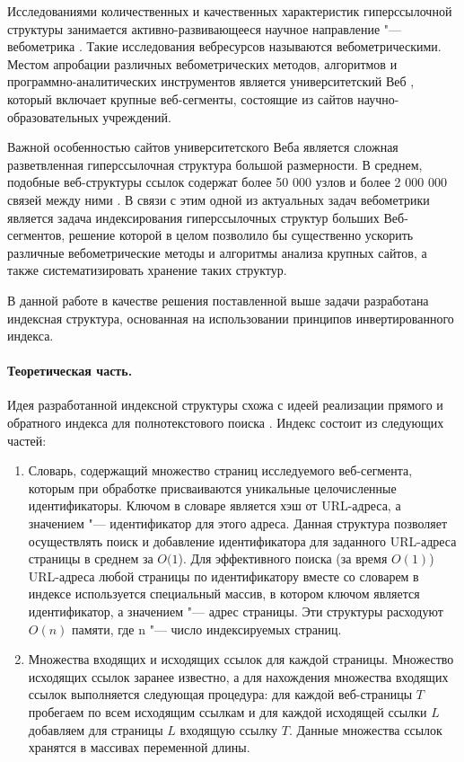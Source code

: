 Исследованиями количественных и качественных характеристик гиперссылочной структуры занимается активно-развивающееся научное направление "--- вебометрика \cite{Pechnikov,PechnikovNwohiri}. Такие исследования вебресурсов называются вебометрическими. Местом апробации различных вебометрических методов, алгоритмов и программно-аналитических инструментов является университетский Веб \cite{Pechnikov,MaksimovBlekanov,BlekanovSergeevMaksimovBOWTIE}, который включает крупные веб-сегменты, состоящие из сайтов научно-образовательных учреждений.

Важной особенностью сайтов университетского Веба является сложная разветвленная гиперссылочная структура большой размерности. В среднем, подобные веб-структуры ссылок содержат более 50 000 узлов и более 2 000 000 связей между ними \cite{Pechnikov,BlekanovSergeevMaksimov}. В связи с этим одной из актуальных задач вебометрики является задача индексирования гиперссылочных структур больших Веб-сегментов, решение которой в целом позволило бы существенно ускорить различные вебометрические методы и алгоритмы анализа крупных сайтов, а также систематизировать хранение таких структур.

В данной работе в качестве решения поставленной выше задачи разработана индексная структура, основанная на использовании принципов инвертированного индекса.

\paragraph{Теоретическая часть.} Идея разработанной индексной структуры схожа с идеей реализации прямого и обратного индекса для полнотекстового поиска \cite{ManningRaghavanSchutze}. Индекс состоит из следующих частей:

\begin{enumerate}
	\item Словарь, содержащий множество страниц исследуемого веб-сегмента, которым при обработке присваиваются уникальные целочисленные идентификаторы. Ключом в словаре является хэш от URL-адреса, а значением "--- идентификатор для этого адреса. Данная структура позволяет осуществлять поиск и добавление идентификатора для заданного URL-адреса страницы в среднем за \(O(1\)). Для эффективного поиска (за время \(O(1)\)) URL-адреса любой страницы по идентификатору вместе со словарем в индексе используется специальный массив, в котором ключом является идентификатор, а значением "--- адрес страницы. Эти структуры расходуют \(O(n)\) памяти, где n "--- число индексируемых страниц.
	\item Множества входящих и исходящих ссылок для каждой страницы. Множество исходящих ссылок заранее известно, а для нахождения множества входящих ссылок выполняется следующая процедура: для каждой веб-страницы \(T\) пробегаем по всем исходящим ссылкам и для каждой исходящей ссылки \(L\) добавляем для страницы \(L\) входящую ссылку \(T\). Данные множества ссылок хранятся в массивах переменной длины.
\end{enumerate}

